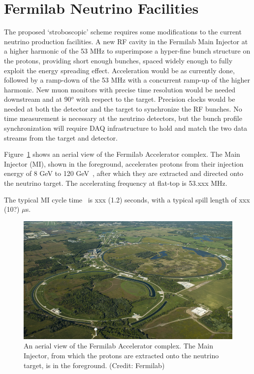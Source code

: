 %
%
\section{Fermilab Neutrino Facilities}
\label{Fermilab}
The proposed `stroboscopic' scheme requires some modifications to the
current neutrino production facilities. A new RF cavity in the Fermilab Main
Injector at a higher harmonic of the 53 MHz to superimpose a
hyper-fine bunch structure on the protons, providing short enough
bunches, spaced widely enough to fully exploit the energy spreading
effect. Acceleration would be as currently done, followed by a
ramp-down of the 53 MHz with a concurrent ramp-up of the higher
harmonic. New muon monitors with precise time resolution would be
needed downstream and at 90$^o$ with respect to the target. Precision
clocks would be needed at both the detector and the target to
synchronize the RF bunches.  No time measurement is necessary at the
neutrino detectors, but the bunch profile synchronization will require DAQ
infrastructure to hold and match the two data streams from the target and
detector.


%


Figure~\ref{fig:fermilab_facility_aerial} shows an aerial view of the
Fermilab Accelerator complex. The Main Injector (MI), shown in the
foreground, accelerates protons from their injection energy of 8 GeV 
to 120 GeV~\cite{units}, after which
they are extracted and directed onto the neutrino target. The
accelerating frequency at flat-top is 53.xxx MHz.

The typical MI cycle time~\cite{vaia} is xxx (1.2) seconds, with a
typical spill length of xxx (10?) $\mu$s. 


\begin{figure}[ht]
	\begin{center}
           	\includegraphics[width=0.7 \linewidth]{Figures/fermilab_facility_07-0329-14D.jpg}
	\end{center}
	\caption{An aerial view of the Fermilab Accelerator complex.
         The Main Injector, from which the protons are extracted onto
         the neutrino target, is in the foreground. (Credit: Fermilab)}
	\label{fig:fermilab_facility_aerial}
\end{figure}


